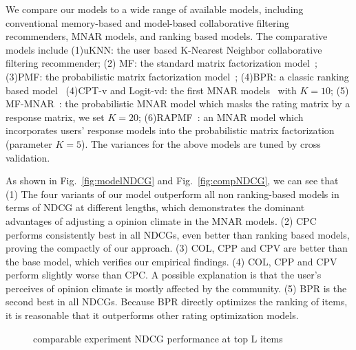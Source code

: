 \documentclass[sigconf]{acmart}
\begin{document}
We compare our models to a wide range of available models, including conventional memory-based and model-based collaborative filtering recommenders, MNAR models, and ranking based models. The comparative models include (1)uKNN: the user based K-Nearest Neighbor collaborative filtering recommender; (2) MF: the standard matrix factorization model~\cite{Koren2009Matrix}; (3)PMF: the probabilistic matrix factorization model~\cite{salakhutdinov2008probabilistic}; (4)BPR: a classic ranking based model~\cite{Rendle2009BPR} (4)CPT-v and Logit-vd: the first MNAR models~\cite{Marlin2009Collaborative} with $K=10$; (5) MF-MNAR~\cite{Hernandez-Lobato2014Probabilistic}: the probabilistic MNAR model which masks the rating matrix by a response matrix, we set $K=20$; (6)RAPMF~\cite{Yang2015Boosting}: an MNAR model which incorporates users' response models into the probabilistic matrix factorization (parameter $K=5$). The variances for the above models are tuned by cross validation.

As shown in Fig.~\ref{fig:modelNDCG} and Fig.~\ref{fig:compNDCG}, we can see that (1) The four variants of our model outperform all non ranking-based models in terms of NDCG at different lengths, which demonstrates the dominant advantages of adjusting a opinion climate in the MNAR models.  (2) CPC performs consistently best in all NDCGs, even better than ranking based models, proving the compactly of our approach. (3) COL, CPP and CPV are better than the base model, which verifies our empirical findings. (4) COL, CPP and CPV perform slightly worse than CPC. A possible explanation is that the user's perceives of opinion climate is mostly affected by the community. (5) BPR is the second best in all NDCGs. Because BPR directly optimizes the ranking of items, it is reasonable that it outperforms other rating optimization models.


\begin{figure}[!htbp]
\centering
{}
\vspace{-1em}
\caption{comparable experiment NDCG performance at top L items}
\end{figure}
\end{document}
